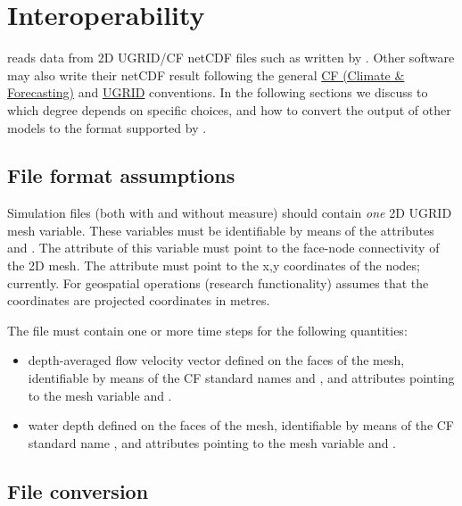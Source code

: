 \chapter{Interoperability} \label{Chp:Sim2Ugrid}

\dfastmi reads data from 2D UGRID/CF netCDF files such as written by \dflowfm.
Other software may also write their netCDF result following the general \href{https://cfconventions.org/}{CF (Climate \& Forecasting)} and \href{http://ugrid-conventions.github.io/ugrid-conventions/}{UGRID} conventions.
In the following sections we discuss to which degree \dfmi depends on \dflowfm specific choices, and how to convert the output of other models to the format supported by \dfmi.

\section{File format assumptions}

Simulation files (both with and without measure) should contain \emph{one} 2D UGRID mesh variable.
These variables must be identifiable by means of the attributes  and .
The  attribute of this variable must point to the face-node connectivity of the 2D mesh.
The  attribute must point to the x,y coordinates of the nodes; currently.
For geospatial operations (research functionality) \dfmi assumes that the coordinates are projected coordinates in metres.

The file must contain one or more time steps for the following quantities:
\begin{itemize}
\item depth-averaged flow velocity vector defined on the faces of the mesh, identifiable by means of the CF standard names  and , and attributes  pointing to the mesh variable and .
\item water depth defined on the faces of the mesh, identifiable by means of the CF standard name , and attributes  pointing to the mesh variable and .
\end{itemize}

\section{File conversion}

